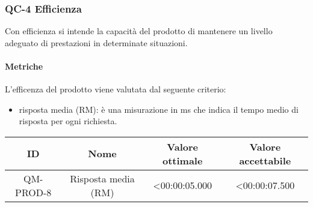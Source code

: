 \subsubsection{QC-4 Efficienza}
Con efficienza si intende la capacità del prodotto di mantenere un livello adeguato di prestazioni in determinate situazioni.
	
	\paragraph{Metriche}
	L'efficenza del prodotto viene valutata dal seguente criterio:
	\begin{itemize}
		\item risposta media (RM): è una misurazione in ms che indica il tempo medio di risposta per ogni richiesta.
	\end{itemize}
	\begin{center}
		\begin{tabular}{|c|c|c|c|}
			\rowcolor{lighter-grayer}
			\hline
			ID & Nome & Valore ottimale & Valore accettabile \\
			\hline
			QM-PROD-8 & Risposta media (RM) & <00:00:05.000 & <00:00:07.500 \\
			\hline
		\end{tabular}
	\end{center}
